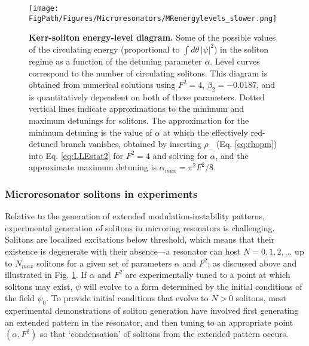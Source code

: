 \begin{figure}[htpb]
	\begin{center}
		\texttt{[image: \\FigPath/Figures/Microresonators/MRenergylevels\_slower.png]}
	\end{center}
	\caption[Kerr-soliton energy-level diagram]{\textbf{Kerr-soliton energy-level diagram.} Some of the possible values of the circulating energy (proportional to $\int d\theta\,|\psi|^2$) in the soliton regime as a function of the detuning parameter $\alpha$. Level curves correspond to the number of circulating solitons. This diagram is obtained from numerical solutions using $F^2=4$, $\beta_2=-0.0187$, and is quantitatively dependent on both of these parameters. Dotted vertical lines indicate approximations to the minimum and maximum detunings for solitons. The approximation for the minimum detuning is the value of $\alpha$ at which the effectively red-detuned branch vanishes, obtained by inserting $\rho_-$ (Eq. \ref{eq:rhopm}) into Eq. \ref{eq:LLEstat2} for $F^2=4$ and solving for $\alpha$, and the approximate maximum detuning is $\alpha_{max}=\pi^2 F^2/8$.}
	
	\label{fig:MRenergylevels}
\end{figure} 





\subsubsection{Microresonator solitons in experiments}


Relative to the generation of extended modulation-instability patterns, experimental generation of solitons in microring resonators is challenging. Solitons are localized excitations below threshold, which means that their existence is degenerate with their absence---a resonator can host $N=0, 1, 2,...$ up to $N_{max}$ solitons for a given set of parameters $\alpha$ and $F^2$; as discussed above and illustrated in Fig. \ref{fig:MRenergylevels}. If $\alpha$ and $F^2$ are experimentally tuned to a point at which solitons may exist, $\psi$ will evolve to a form determined by the initial conditions of the field $\psi_0$. To provide initial conditions that evolve to $N>0$ solitons, most experimental demonstrations of soliton generation have involved first generating an extended pattern in the resonator, and then tuning to an appropriate point $(\alpha,F^2)$ so that `condensation' of solitons from the extended pattern occurs. 

